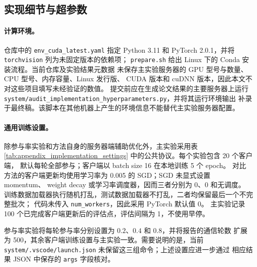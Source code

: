 \subsection{实现细节与超参数}
\label{app:implementation_hyperparameters}

\paragraph{计算环境。}
仓库中的 \texttt{env\_cuda\_latest.yaml} 指定 Python 3.11 和
PyTorch 2.0.1，并将 \texttt{torchvision} 列为未固定版本的依赖项；
\texttt{prepare.sh} 给出 Linux 下的 Conda 安装流程。当前仓库及实验结果元数据
未保存主实验服务器的 GPU 型号与数量、CPU 型号、内存容量、Linux 发行版、
CUDA 版本和 cuDNN 版本，因此本文不对这些项目填写未经验证的数值。
提交前应在生成论文结果的主要服务器上运行
\texttt{system/audit\_implementation\_hyperparameters.py}，并将其运行环境输出
补录于最终稿。该脚本在其他机器上产生的环境信息不能替代主实验服务器配置。

\paragraph{通用训练设置。}
除参与率实验和方法自身的服务器端辅助优化外，主实验采用表
\ref{tab:appendix_implementation_settings} 中的公共协议。每个实验包含 20 个客户端，
默认每轮全部参与；客户端以 batch size 16 在本地训练 5 个 epoch。
对比方法的客户端更新均使用学习率为 0.005 的 SGD；SGD 未显式设置 momentum、
weight decay 或学习率调度器，因而三者分别为 0、0 和无调度。
训练数据加载器执行随机打乱，测试数据加载器不打乱，二者均保留最后一个不完整批次；
代码未传入 \texttt{num\_workers}，因此采用 PyTorch 默认值 0。
主实验记录 100 个已完成客户端更新后的评估点，评估间隔为 1，不使用早停。

参与率实验将每轮参与率分别设置为 $0.2$、$0.4$ 和 $0.8$，并将报告的通信轮数
扩展为 500，其余客户端训练设置与主实验一致。需要说明的是，当前
\texttt{system/.vscode/launch.json} 未保留这三组命令；上述设置应进一步通过
相应结果 JSON 中保存的 \texttt{args} 字段核对。

